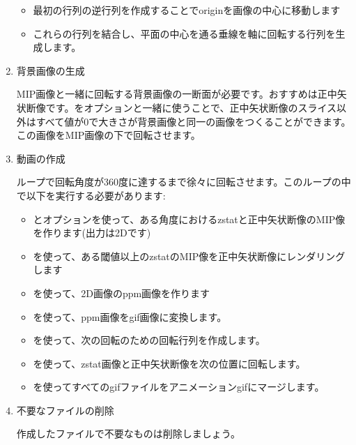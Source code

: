 \documentclass{jsarticle}
\begin{document}
\begin{enumerate}
\begin{itemize}
	\item 最初の行列の逆行列を作成することでoriginを画像の中心に移動します

	\item これらの行列を結合し、{\color{red}}平面の中心を通る垂線を軸に回転する行列を生成します。

	\end{itemize}


\item 背景画像の生成

MIP画像と一緒に回転する背景画像の一断面が必要です。おすすめは正中矢状断像です。{\color{red}}を{\color{red}}オプションと一緒に使うことで、正中矢状断像のスライス以外はすべて値が0で大きさが背景画像と同一の画像をつくることができます。この画像をMIP画像の下で回転させます。

\item 動画の作成

{\color{red}}ループで回転角度が360度に達するまで徐々に回転させます。このループの中で以下を実行する必要があります:

	\begin{itemize}

	\item {\color{red}}と{\color{red}}オプションを使って、ある角度におけるzstatと正中矢状断像のMIP像を作ります(出力は2Dです)

	\item {\color{red}}を使って、ある閾値以上のzstatのMIP像を正中矢状断像にレンダリングします

	\item {\color{red}}を使って、2D画像のppm画像を作ります

	\item {\color{red}}を使って、ppm画像をgif画像に変換します。

	\item {\color{red}}を使って、次の回転のための回転行列を作成します。

	\item {\color{red}}を使って、zstat画像と正中矢状断像を次の位置に回転します。

	\item {\color{red}}を使ってすべてのgifファイルをアニメーションgifにマージします。

	\end{itemize}

\item 不要なファイルの削除

作成したファイルで不要なものは削除しましょう。

\end{enumerate}
\end{document}
